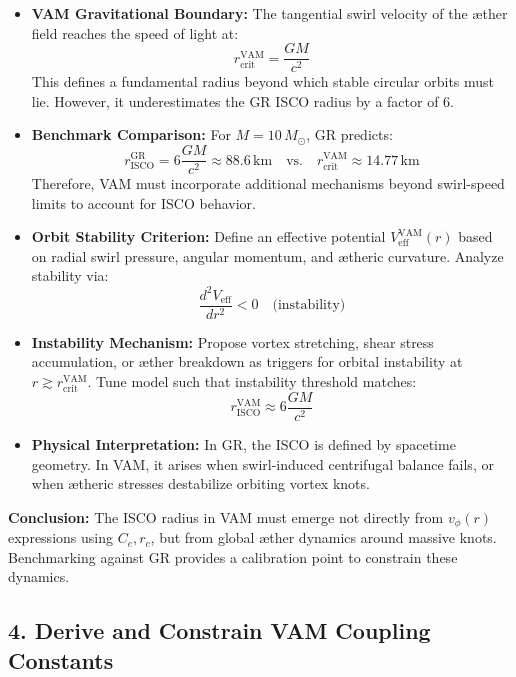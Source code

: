 \begin{itemize}
    \item \textbf{VAM Gravitational Boundary:} The tangential swirl velocity of the æther field reaches the speed of light at:
    \[
    r_\text{crit}^{\text{VAM}} = \frac{GM}{c^2}
    \]
    This defines a fundamental radius beyond which stable circular orbits must lie. However, it underestimates the GR ISCO radius by a factor of 6.

    \item \textbf{Benchmark Comparison:} For \( M = 10\,M_\odot \), GR predicts:
    \[
    r_{\text{ISCO}}^{\text{GR}} = 6 \frac{GM}{c^2} \approx 88.6\,\text{km}
    \quad\text{vs.}\quad
    r_\text{crit}^{\text{VAM}} \approx 14.77\,\text{km}
    \]
    Therefore, VAM must incorporate additional mechanisms beyond swirl-speed limits to account for ISCO behavior.

    \item \textbf{Orbit Stability Criterion:} Define an effective potential \( V_\text{eff}^{\text{VAM}}(r) \) based on radial swirl pressure, angular momentum, and ætheric curvature. Analyze stability via:
    \[
    \frac{d^2 V_\text{eff}}{dr^2} < 0 \quad \text{(instability)}
    \]

    \item \textbf{Instability Mechanism:} Propose vortex stretching, shear stress accumulation, or æther breakdown as triggers for orbital instability at \( r \gtrsim r_\text{crit}^{\text{VAM}} \). Tune model such that instability threshold matches:
    \[
    r_{\text{ISCO}}^{\text{VAM}} \approx 6 \frac{GM}{c^2}
    \]

    \item \textbf{Physical Interpretation:} In GR, the ISCO is defined by spacetime geometry. In VAM, it arises when swirl-induced centrifugal balance fails, or when ætheric stresses destabilize orbiting vortex knots.
\end{itemize}

\noindent
\textbf{Conclusion:} The ISCO radius in VAM must emerge not directly from \( v_\phi(r) \) expressions using \( C_e, r_c \), but from global æther dynamics around massive knots. Benchmarking against GR provides a calibration point to constrain these dynamics.

\subsection*{4. Derive and Constrain VAM Coupling Constants}

